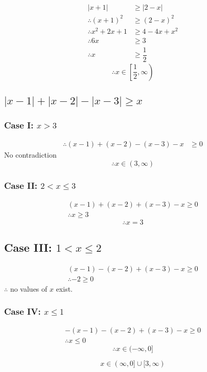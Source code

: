 \documentclass[fleqn, a4paper, 10pt]{article}
\begin{document}
\begin{align*}
	|x + 1| &\geq |2 - x|\\
	\therefore (x + 1)^2 &\geq (2 - x)^2 \\
	\therefore x^2 +2x + 1 &\geq 4 - 4x + x^2\\
	\therefore 6x &\geq 3\\
	\therefore x &\geq \dfrac{1}{2}
\end{align*}
\begin{equation*}
	\therefore x \in \left[\dfrac{1}{2}, \infty\right)
\end{equation*}

\subsection{$|x - 1| + |x - 2| - |x - 3| \geq x$}

\subsubsection*{Case I: $x > 3$}
\begin{align*}
	\therefore (x - 1) + (x - 2) - (x - 3) -x &\geq 0
\end{align*}
No contradiction\\
\begin{equation*}
	\therefore x \in (3, \infty)
\end{equation*}

\subsubsection*{Case II: $2 < x \leq 3$}

\begin{align*}
	(x - 1) + (x - 2) + (x - 3) - x \geq 0\\
	\therefore x \geq 3
\end{align*}
\begin{equation*}
	\therefore x = 3
\end{equation*}

\subsection*{Case III: $1 < x \leq 2$}

\begin{align*}
	(x - 1) - (x - 2) + (x - 3) - x \geq 0\\
	\therefore -2 \geq 0
\end{align*}
$\therefore$ no values of $x$ exist.

\subsubsection*{Case IV: $x \leq 1$}

\begin{align*}
	-(x - 1) - (x - 2) + (x - 3) - x \geq 0\\
	\therefore x \leq 0
\end{align*}
\begin{equation*}
	\therefore x \in (-\infty, 0]
\end{equation*}

\begin{equation*}
	\boxed{x \in (\infty, 0] \cup [3, \infty)}
\end{equation*}
\end{document}
